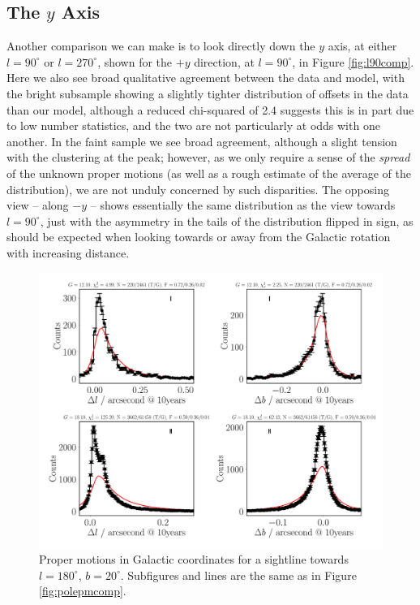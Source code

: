 \documentclass[fleqn,usenatbib]{mnras}
\begin{document}
\subsection{The $y$ Axis}
Another comparison we can make is to look directly down the $y$ axis, at either $l = 90^\circ$ or $l = 270^\circ$, shown for the $+y$ direction, at $l = 90^\circ$, in Figure \ref{fig:l90comp}. Here we also see broad qualitative agreement between the data and model, with the bright subsample showing a slightly tighter distribution of offsets in the data than our model, although a reduced chi-squared of 2.4 suggests this is in part due to low number statistics, and the two are not particularly at odds with one another. In the faint sample we see broad agreement, although a slight tension with the clustering at the peak; however, as we only require a sense of the \textit{spread} of the unknown proper motions (as well as a rough estimate of the average of the distribution), we are not unduly concerned by such disparities. The opposing view -- along $-y$ -- shows essentially the same distribution as the view towards $l = 90^\circ$, just with the asymmetry in the tails of the distribution flipped in sign, as should be expected when looking towards or away from the Galactic rotation with increasing distance.

\begin{figure}
    \centering
    \includegraphics[width=\columnwidth]{Plots/plots_pm_gaia_180_20.pdf}
    \caption{Proper motions in Galactic coordinates for a sightline towards $l = 180^\circ$, $b = 20^\circ$. Subfigures and lines are the same as in Figure \ref{fig:polepmcomp}.}
    \label{fig:l180comp}
\end{figure}
\end{document}

